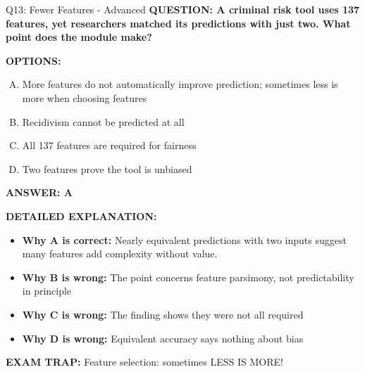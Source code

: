 \documentclass[8pt]{beamer}
\begin{document}
\begin{frame}[shrink=6]{Q13: Fewer Features - Advanced}
\fontsize{6.5}{7.5}\selectfont
\textbf{QUESTION: A criminal risk tool uses 137 features, yet researchers matched its predictions with just two. What point does the module make?}

\vspace{0.1cm}
\textbf{OPTIONS:}
\begin{enumerate}[A.]
\item More features do not automatically improve prediction; sometimes less is more when choosing features
\item Recidivism cannot be predicted at all
\item All 137 features are required for fairness
\item Two features prove the tool is unbiased
\end{enumerate}

\vspace{0.1cm}
\textcolor{myblue}{\textbf{ANSWER: A}}

\vspace{0.1cm}
\textbf{DETAILED EXPLANATION:}
\begin{itemize}
\item \textbf{Why A is correct:} Nearly equivalent predictions with two inputs suggest many features add complexity without value.
\item \textbf{Why B is wrong:} The point concerns feature parsimony, not predictability in principle
\item \textbf{Why C is wrong:} The finding shows they were not all required
\item \textbf{Why D is wrong:} Equivalent accuracy says nothing about bias
\end{itemize}

\textcolor{myred}{\textbf{EXAM TRAP:}} Feature selection: sometimes LESS IS MORE!
\end{frame}
\end{document}
